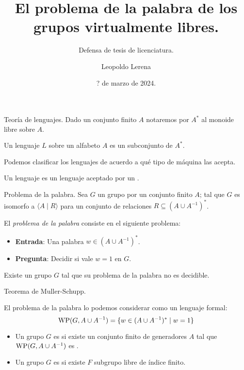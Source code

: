 \documentclass[aspectratio=169, 11pt]{beamer}
\title{El problema de la palabra de los grupos virtualmente libres.}
\subtitle{Defensa de tesis de licenciatura.}
\date{? de marzo de 2024.}
\author{Leopoldo Lerena}
\institute{Universidad de Buenos Aires}
\begin{document}
	\maketitle

	
	\begin{frame}[fragile]{Teoría de lenguajes.}
		Dado un conjunto finito $A$ notaremos por $A^*$ al monoide libre sobre $A$.
		
		\begin{deff}
			Un lenguaje $L$ sobre un alfabeto $A$ es un subconjunto de $A^*$.
		\end{deff}	
		
		Podemos clasificar los lenguajes de acuerdo a qué tipo de máquina las acepta.
		
		Un lenguaje \ic{} es un lenguaje aceptado por un \APND.
			
	\end{frame}
	
	
	\begin{frame}[fragile]{Problema de la palabra.}
		Sea $G$ un grupo \fg por un conjunto finito $A$; 
		tal que $G$ es isomorfo a $\langle A \mid R \rangle$ para un conjunto de relaciones $R \subseteq (A \cup A^{-1})^*$.
		
		El \emph{problema de la palabra} consiste en el siguiente problema:
		\begin{itemize}
			\item 
				\textbf{Entrada}: Una palabra $w \in (A \cup A^{-1})^*$.
			
			\item 
				\textbf{Pregunta}: Decidir si vale $w=1$ en $G$.
		\end{itemize}
		
		Existe un grupo $G$ \fg tal que su problema de la palabra no es decidible.
		
		
		
	\end{frame}
	
	
	
	
	\begin{frame}[fragile]{Teorema de Muller-Schupp.}
		
		
		El problema de la palabra lo podemos considerar como un lenguaje formal:
		\[
		\text{WP}(G, A \cup A^{-1}) = \{ w \in (A \cup A^{-1})^* \mid w = 1 \}
		\]
		
		\begin{itemize}
			\item 
				Un grupo $G$ \fg es \emph{\ic} si existe un conjunto finito de generadores $A$ tal que $\text{WP}(G, A \cup A^{-1})$ es \ic.
				
			\item 
				Un grupo \fg $G$ es \emph{\vl} si existe $F$ subgrupo libre de índice finito.
				
		\end{itemize}
	\end{frame}
\end{document}

